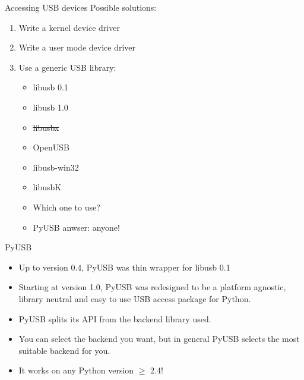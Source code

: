 \documentclass[pdf]{beamer}
\begin{document}
\begin{frame}{Accessing USB devices}
  \transdissolve
  \pause
  Possible solutions:
  \begin{enumerate}
    \pause
    \item Write a kernel device driver
    \pause
    \item Write a user mode device driver
    \pause
    \item Use a generic USB library:
      \pause
      \begin{itemize}
          \item libusb 0.1
          \item libusb 1.0
          \item \sout{libusbx}
          \item OpenUSB
          \item libusb-win32
          \item libusbK
      \end{itemize}
      \begin{itemize}
        \pause
        \item Which one to use?
        \pause
        \item PyUSB anwser: anyone!
      \end{itemize}
  \end{enumerate}
\end{frame}

\begin{frame}{PyUSB}
  \transdissolve
  \begin{itemize}
    \item Up to version 0.4, PyUSB was thin wrapper for libusb 0.1
    \item Starting at version 1.0, PyUSB was redesigned to be a
      platform agnostic, library neutral and easy to use USB access
      package for Python.
    \item PyUSB splits its API from the backend library used.
    \item You can select the backend you want, but in general PyUSB
      selects the most suitable backend for you.
    \item It works on any Python version $\ge$ 2.4!
  \end{itemize}
\end{frame}
\end{document}
